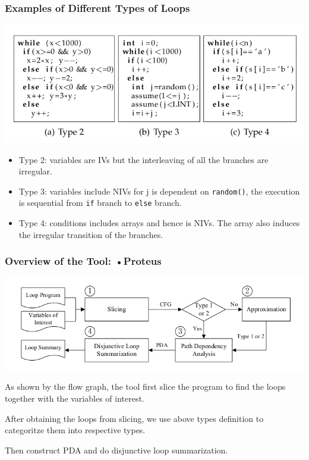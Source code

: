 \documentclass[11pt]{beamer}
\begin{document}
\begin{frame}\frametitle{Examples of Different Types of Loops}
\begin{center}
\includegraphics[scale=0.35]{othertypeexp.png}
\end{center}
\begin{itemize}
\item Type 2: variables are IVs but the interleaving of all the branches are irregular.

\item Type 3: variables include NIVs for j is dependent on \texttt{random()}, the execution is sequential from \texttt{if} branch to \texttt{else} branch.

\item Type 4: conditions includes arrays and hence is NIVs. The array also induces the irregular transition of the branches.  
\end{itemize}

\end{frame}

\begin{frame}\frametitle{Overview of the Tool: \textsc{•}{Proteus}}
\begin{center}
\includegraphics[scale=0.4]{proteus.png}
\end{center}
As shown by the flow graph, the tool first slice the program to find the loops together with the variables of interest.

After obtaining the loops from slicing, we use above types definition to categoritze them into respective types.

Then construct PDA and do disjunctive loop summarization.


\end{frame}
\end{document}
